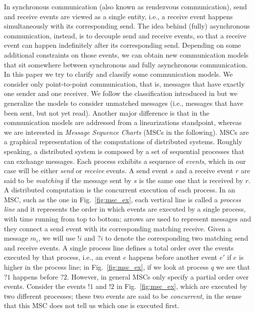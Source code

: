 


In synchronous communication (also known as rendezvous communication), send and receive events are  viewed as a single entity, i.e., a receive event  happens simultaneously with its corresponding send. The  idea behind (fully) asynchronous communication, instead, is to decouple send and receive events, so that a receive event can happen indefinitely after its corresponding send. Depending on some additional constraints on those events, we can obtain new communication models that sit somewhere between synchronous and fully asynchronous communication.
In this paper we try to clarify and classify some communication models.  We consider only point-to-point communication, that is, messages that have exactly one sender and one receiver.  We follow the classification introduced in \cite{DBLP:journals/fac/ChevrouHQ16} but we generalize the models to  consider unmatched messages (i.e., messages that have been sent, but not yet read). Another major difference is that in \cite{DBLP:journals/fac/ChevrouHQ16} the communication models are addressed from a linearizations standpoint, whereas we are interested in \emph{Message Sequence Charts} (MSCs in the following). 
MSCs  are a graphical representation of the  computations of distributed systems.  Roughly speaking, a distributed system is composed by a set of sequential processes that can exchange messages. Each process exhibits a sequence of \emph{events}, which in our case will be either \emph{send} or \emph{receive} events. A send event $s$ and a receive event $r$ are said to be \emph{matching} if the message sent by $s$ is the same one that is received by $r$. A distributed computation is the concurrent execution of each process. In an MSC, such as the one in Fig.~\ref{fig:msc_ex}, each vertical line is called a \emph{process line} and it represents the order in which events are executed by a single process, with time running from top to bottom; arrows are used to represent messages and they connect a send event with its corresponding matching receive. 
Given a message $m_i$, we will use $!i$ and $?i$ to denote the corresponding two matching send and receive events. A single process line defines a total order over the events executed by that process, i.e., an event $e$ happens before another event $e'$ if $e$ is higher in the process line; in Fig.~\ref{fig:msc_ex}, if we look at process $q$ we see that $?1$ happens before $?2$. However, in general MSCs only specify a partial order over events. Consider the events $!1$ and $!2$ in Fig.~\ref{fig:msc_ex}, which are executed by two different processes; these two events are said to be \emph{concurrent}, in the sense that this MSC does not tell us which one is executed first. 
